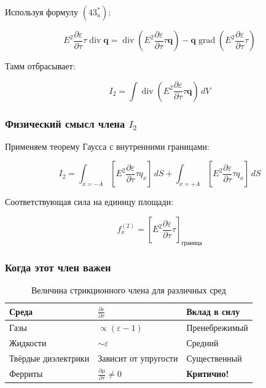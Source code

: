 \documentclass[a4paper,12pt]{article}
\begin{document}
Используя формулу $(43^*_a)$:

\begin{equation}
E^2\frac{\partial\varepsilon}{\partial\tau}\tau\operatorname{div}\mathbf{q} =
\operatorname{div}\!\left(E^2\frac{\partial\varepsilon}{\partial\tau}
\tau\mathbf{q}\right) -
\mathbf{q}\operatorname{grad}\!\left(E^2\frac{\partial\varepsilon}{\partial\tau}
\tau\right)
\label{eq:divergence_identity_2}
\end{equation}

Тамм отбрасывает:

\begin{equation}
\boxed{
I_2 = \int \operatorname{div}\!\left(E^2\frac{\partial\varepsilon}{\partial\tau}
\tau\mathbf{q}\right)\,dV
}
\label{eq:discarded_term_2}
\end{equation}

\subsubsection{Физический смысл члена $I_2$}

Применяем теорему Гаусса с внутренними границами:

\begin{equation}
I_2 = \int_{x=-A} \left[E^2\frac{\partial\varepsilon}{\partial\tau}
\tau q_x\right]\,dS + \int_{x=+A} \left[E^2\frac{\partial\varepsilon}{\partial\tau}
\tau q_x\right]\,dS
\label{eq:term_2_gauss}
\end{equation}

Соответствующая сила на единицу площади:

\begin{equation}
\boxed{
f_x^{(2)} = \left[E^2\frac{\partial\varepsilon}{\partial\tau}\tau\right]_{\text{граница}}
}
\label{eq:force_term_2}
\end{equation}

\subsubsection{Когда этот член важен}

\begin{table}[h]
\centering
\caption{Величина стрикционного члена для различных сред}
\label{tab:striction_comparison}
\begin{tabular}{@{}lll@{}}
\toprule
\textbf{Среда} & $\frac{\partial\varepsilon}{\partial\tau}$ & \textbf{Вклад в силу} \\
\midrule
Газы & $\propto (\varepsilon-1)$ & Пренебрежимый \\
Жидкости & $\sim \varepsilon$ & Средний \\
Твёрдые диэлектрики & Зависит от упругости & Существенный \\
Ферриты & $\frac{\partial\mu}{\partial\tau} \neq 0$ & \textbf{Критично!} \\
\bottomrule
\end{tabular}
\end{table}
\end{document}
